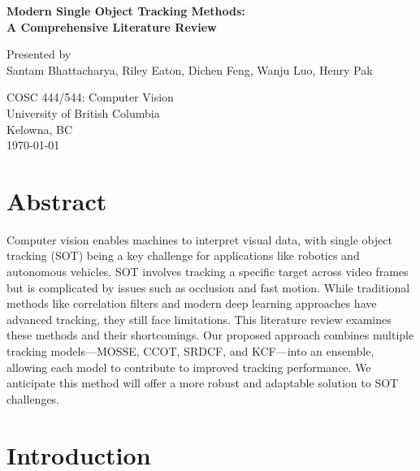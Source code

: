 \documentclass[11pt, letterpaper]{article}
\begin{document}
\begin{titlepage}
  \begin{center}
      \vspace*{1cm}
      
      \fontsize{18}{18}\textbf{Modern Single Object Tracking Methods:} \\
      \fontsize{18}{18}\textbf{A Comprehensive Literature Review}
      
      \vspace{0.5cm}
      Presented by \\
      Santam Bhattacharya, Riley Eaton, Dichen Feng, Wanju Luo, Henry Pak
      
      \vfill
          
      COSC 444/544: Computer Vision \\
      University of British Columbia \\
      Kelowna, BC \\
      \today
          
  \end{center}
\end{titlepage}

\clearpage
\section{Abstract}

Computer vision enables machines to interpret visual data, with single object tracking (SOT) being a key challenge for applications like robotics and autonomous vehicles. SOT involves tracking a specific target across video frames but is complicated by issues such as occlusion and fast motion. While traditional methods like correlation filters and modern deep learning approaches have advanced tracking, they still face limitations. This literature review examines these methods and their shortcomings. Our proposed approach combines multiple tracking models—MOSSE, CCOT, SRDCF, and KCF—into an ensemble, allowing each model to contribute to improved tracking performance. We anticipate this method will offer a more robust and adaptable solution to SOT challenges.



\section{Introduction}
\end{document}
